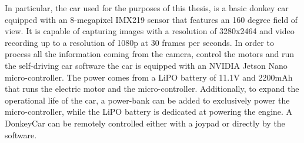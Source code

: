 In particular, the car used for the purposes of this thesis, is a basic donkey car equipped with an 8-megapixel IMX219 sensor that features an 160 degree field of view. It is capable of capturing images with a resolution of 3280x2464 and video recording up to a resolution of 1080p at 30 frames per seconds. In order to process all the information coming from the camera, control the motors and run the self-driving car software the car is equipped with an NVIDIA Jetson Nano micro-controller. The power comes from a LiPO battery of 11.1V and 2200mAh that runs the electric motor and the micro-controller. Additionally, to expand the operational life of the car, a power-bank can be added to exclusively power the micro-controller, while the LiPO battery is dedicated at powering the engine. 
A DonkeyCar can be remotely controlled either with a joypad or directly by the software.